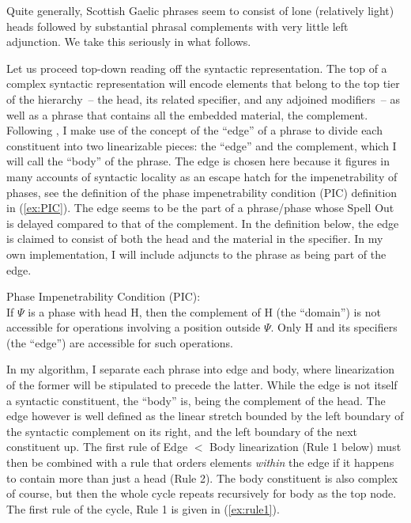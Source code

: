 \documentclass[output=paper,colorlinks,citecolor=brown]{langscibook}
\begin{document}
Quite generally, Scottish Gaelic phrases seem to consist of lone (relatively light) heads followed by substantial phrasal complements with very little left adjunction. We take this seriously in what follows.

Let us proceed top-down reading off the syntactic representation. The top of a complex syntactic representation will encode elements that belong to the top tier of the hierarchy~-- the head, its related specifier, and any adjoined modifiers~-- as well as a phrase that contains all the embedded material, the complement. Following \citet{Chomsky2000, Chomsky2001}, I make use of the concept of the “edge”  of a phrase to divide each constituent into two linearizable pieces: the “edge”  and the complement, which I will call the “body” of the phrase.  The edge is chosen here because it figures in many accounts of syntactic locality as an escape hatch for the impenetrability of phases, see the definition of the phase impenetrability condition (PIC) definition in (\ref{ex:PIC}). The edge seems to be the part of a phrase\slash phase whose Spell Out is delayed compared to that of the complement. In the definition below, the edge is claimed to consist of both the head and the material in the specifier. In my own implementation, I will include adjuncts to the phrase as being part of the edge.

\ea\label{ex:PIC}
Phase Impenetrability Condition (PIC):\smallskip\\
If $\Psi$ is a phase with head H, then the complement of H (the
“domain”) is not accessible for operations involving a position
outside $\Psi$. Only H and its specifiers (the “edge”) are accessible for such operations.
\z
 
In my algorithm, I separate each phrase into edge and body, where linearization of the former will be stipulated  to precede the latter. While the edge is not itself a syntactic constituent, the “body” is, being the complement of the head. The edge however is well defined as the linear stretch bounded by the left boundary of the syntactic complement on its right, and the left boundary of the next constituent up.   The first rule of Edge $<$ Body linearization (Rule 1 below)  must then be combined with a rule that orders elements \textit{within} the edge if it happens to contain more than just a head (Rule 2). The body constituent is also complex of course, but then the whole cycle repeats recursively for body as the top node. The first rule of the cycle, Rule 1 is given in (\ref{ex:rule1}). 
 
\end{document}
